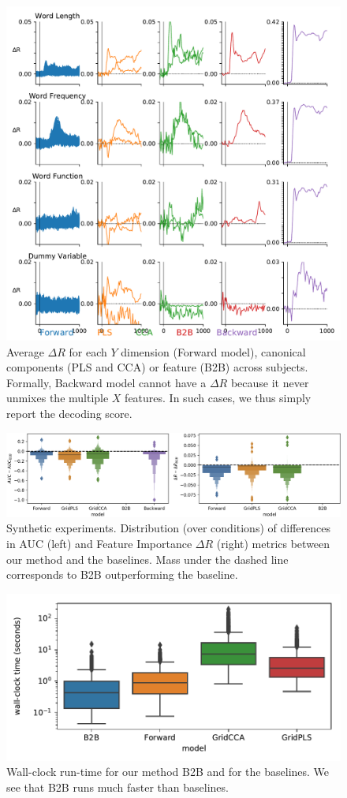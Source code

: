\begin{figure}[t!]
  \centering
  \includegraphics[width=\textwidth, trim=0cm 0cm 0cm 0cm, clip=True]{figures/meg_supp.pdf}
  \caption{Average $\Delta R$ for each $Y$ dimension (Forward model), canonical components (PLS and CCA) or feature (B2B) across subjects. Formally, Backward model cannot have a $\Delta R$ because it never unmixes the multiple $X$ features. In such cases, we thus simply report the decoding score.}
  \label{fig:meg_supp}
\end{figure}


\begin{figure}
  \centering
  \includegraphics[width=\linewidth]{figures/AUC_R.png}
  \caption{Synthetic experiments. Distribution (over conditions) of differences in AUC (left) and Feature Importance $\Delta R$ (right) metrics between our method and the baselines. Mass under the dashed line corresponds to B2B outperforming the baseline. \label{fig:auc_plots}}
\end{figure}

\begin{figure}
  \centering
  \includegraphics[width=0.7\linewidth]{figures/duration}
  \caption{Wall-clock run-time for our method B2B and for the baselines. We see that B2B runs much faster than baselines. \label{fig:duration}}
\end{figure}


